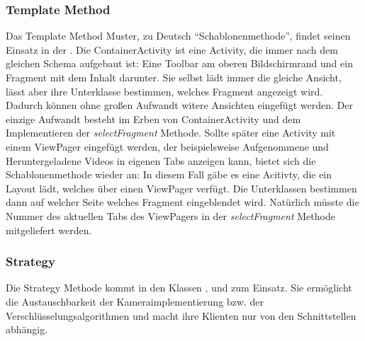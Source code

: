\subsubsection{Template Method}
Das Template Method Muster, zu Deutsch ``Schablonenmethode'', findet seinen Einsatz in der . Die ContainerActivity ist eine Activity, die immer nach dem gleichen Schema aufgebaut ist: Eine Toolbar am oberen Bildschirmrand und ein Fragment mit dem Inhalt darunter. Sie selbst lädt immer die gleiche Ansicht, lässt aber ihre Unterklasse bestimmen, welches Fragment angezeigt wird. Dadurch können ohne großen Aufwandt witere Ansichten eingefügt werden. Der einzige Aufwandt besteht im Erben von ContainerActivity und dem Implementieren der \textit{selectFragment} Methode.\newline
Sollte später eine Activity mit einem ViewPager eingefügt werden, der beispielsweise Aufgenommene und Heruntergeladene Videos in eigenen Tabs anzeigen kann, bietet sich die Schablonenmethode wieder an: In diesem Fall gäbe es eine Acitivty, die ein Layout lädt, welches über einen ViewPager verfügt. Die Unterklassen bestimmen dann auf welcher Seite welches Fragment eingeblendet wird. Natürlich müsste die Nummer des aktuellen Tabs des ViewPagers in der \textit{selectFragment} Methode mitgeliefert werden.

\subsubsection{Strategy}
Die Strategy Methode kommt in den Klassen ,  und   zum Einsatz. Sie ermöglicht die Austauschbarkeit der Kameraimplementierung bzw. der Verschlüsselungsalgorithmen und macht ihre Klienten nur von den Schnittstellen abhängig.
